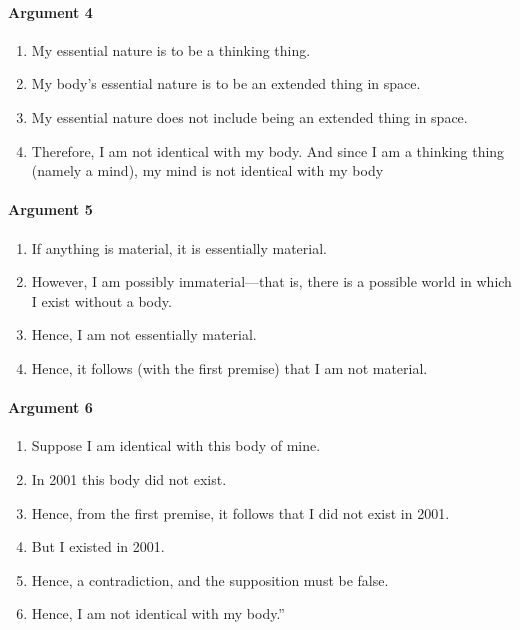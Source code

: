 \documentclass[]{article}
\begin{document}
\paragraph{Argument 4}\label{argument-4}

\begin{enumerate}
\def\labelenumi{\arabic{enumi}.}
\itemsep1pt\parskip0pt
\item
  My essential nature is to be a thinking thing.
\item
  My body's essential nature is to be an extended thing in space.
\item
  My essential nature does not include being an extended thing in space.
\item
  Therefore, I am not identical with my body. And since I am a thinking
  thing (namely a mind), my mind is not identical with my body
\end{enumerate}

\paragraph{Argument 5}\label{argument-5}

\begin{enumerate}
\def\labelenumi{\arabic{enumi}.}
\itemsep1pt\parskip0pt
\item
  If anything is material, it is essentially material.
\item
  However, I am possibly immaterial---that is, there is a possible world
  in which I exist without a body.
\item
  Hence, I am not essentially material.
\item
  Hence, it follows (with the first premise) that I am not material.
\end{enumerate}

\paragraph{Argument 6}\label{argument-6}

\begin{enumerate}
\def\labelenumi{\arabic{enumi}.}
\itemsep1pt\parskip0pt
\item
  Suppose I am identical with this body of mine.
\item
  In 2001 this body did not exist.
\item
  Hence, from the first premise, it follows that I did not exist in
  2001.
\item
  But I existed in 2001.
\item
  Hence, a contradiction, and the supposition must be false.
\item
  Hence, I am not identical with my body.''
\end{enumerate}
\end{document}
